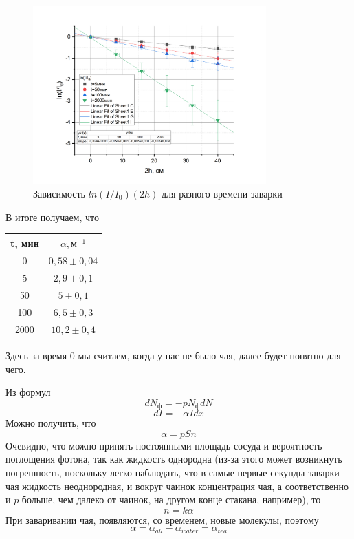 \documentclass[a4paper, 12pt]{article}%
\begin{document}
\begin{figure}[h]
\begin{center}
\includegraphics[width = 0.8\textwidth]{6.jpg}
\caption{Зависимость $ln(I/I_0)(2h)$ для разного времени заварки}
\end{center}
\end{figure}
В итоге получаем, что 

\begin{table}[h]
\begin{tabular}{|c|c|}
\hline
t, мин & $\alpha, \text{м}^{-1}$ \\ \hline
0      & $0,58\pm0,04$             \\ \hline
5      & $2,9\pm0,1$             \\ \hline
50     & $5\pm0,1$               \\ \hline
100    & $6,5\pm0,3$             \\ \hline
2000   & $10,2\pm0,4$            \\ \hline
\end{tabular}
\end{table}
Здесь за время 0 мы считаем, когда у нас не было чая, далее будет понятно для чего. 

Из формул 
\[dN_{\text{ф}} = - p N_{\text{ф}}dN\]
\[dI =-\alpha I dx\]
Можно получить, что 
\[\alpha = pSn\]
Очевидно, что можно принять постоянными площадь сосуда и вероятность поглощения фотона, так как жидкость однородна (из-за этого может возникнуть погрешность, поскольку легко наблюдать, что в самые первые секунды заварки чая жидкость неоднородная, и вокруг чаинок концентрация чая, а соответственно и $p$ больше, чем далеко от чаинок, на другом конце стакана, например), то 
\[n = k \alpha\]
При заваривании чая, появляются, со временем, новые молекулы, поэтому \[\alpha = \alpha_{all} - \alpha_{water} = \alpha_{tea}\]
\end{document}

